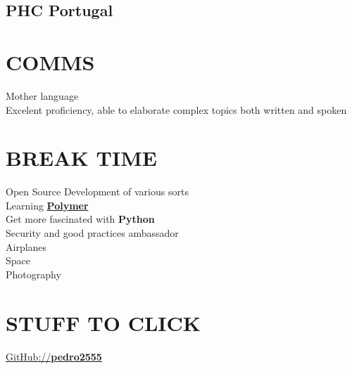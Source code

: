 \documentclass[letterpaper]{deedy-resume} %
\begin{document}
\begin{minipage}[t]{0.33\textwidth}
\subsection{PHC Portugal}

\sectionspace

\section{COMMS}
Mother language\\
Excelent proficiency, able to elaborate complex topics both written and spoken\\

\section{BREAK TIME}
Open Source Development of various sorts\\
Learning \textbf{\href{https://www.polymer-project.org/}{Polymer}}\\
Get more fascinated with \textbf{Python}\\
Security and good practices ambassador\\
Airplanes\\
Space\\
Photography\\

\section{STUFF TO CLICK}
\href{https://github.com/pedro2555}{GitHub://\textbf{pedro2555}}\\

\end{minipage}
\hfill
%
%
\end{document}
